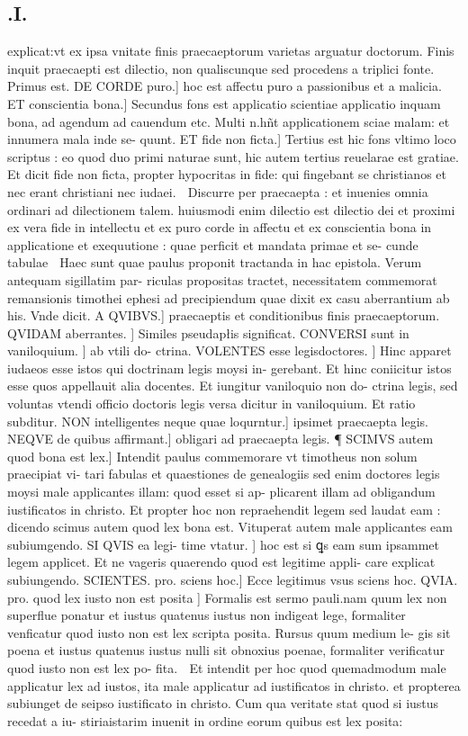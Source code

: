 \documentclass{article}
\begin{document}
\begin{pages}
\section*{.I. }\pstart explicat:vt ex ipsa vnitate finis praecaeptorum varietas arguatur doctorum. Finis inquit praecaepti est dilectio, non qualiscunque sed procedens a triplici fonte. Primus est. DE CORDE puro.] hoc est affectu puro a passionibus et a malicia. ET conscientia bona.] Secundus fons est applicatio scientiae applicatio inquam bona, ad agendum ad cauendum etc. Multi n.hñt applicationem sciae malam: et innumera mala inde se- quunt. ET fide non ficta.] Tertius est hic fons vltimo loco scriptus : eo quod duo primi naturae sunt, hic autem tertius reuelarae est gratiae. Et dicit fide non ficta, propter hypocritas in fide: qui fingebant se christianos  et nec erant christiani nec iudaei.  Discurre per praecaepta : et inuenies omnia ordinari ad dilectionem talem. huiusmodi enim dilectio est dilectio dei et proximi ex vera fide in intellectu et ex puro corde in affectu et ex conscientia bona in applicatione et exequutione : quae perficit et mandata primae et se- cunde tabulae  Haec sunt quae paulus proponit tractanda in hac epistola. Verum antequam sigillatim par- riculas propositas tractet, necessitatem commemorat remansionis timothei ephesi ad precipiendum quae dixit ex casu aberrantium ab his. Vnde dicit. A QVIBVS.] praecaeptis et conditionibus finis praecaeptorum. QVIDAM aberrantes. ] Similes pseudapłis significat. CONVERSI sunt in vaniloquium. ] ab vtili do- ctrina. VOLENTES esse legisdoctores. ] Hinc apparet iudaeos esse istos qui doctrinam legis moysi in- gerebant. Et hinc coniicitur istos esse quos appellauit alia docentes. Et iungitur vaniloquio non do- ctrina legis, sed voluntas vtendi officio doctoris legis versa dicitur in vaniloquium. Et ratio subditur. NON intelligentes neque quae loqurntur.] ipsimet praecaepta legis. NEQVE de quibus affirmant.] obligari ad praecaepta legis.  \pend\pstart ¶ SCIMVS autem quod bona est lex.] Intendit paulus commemorare vt timotheus non solum praecipiat vi- tari fabulas et quaestiones de genealogiis sed enim doctores legis moysi male applicantes illam: quod esset si ap- plicarent illam ad obligandum iustificatos in christo. Et propter hoc non repraehendit legem sed laudat eam : dicendo scimus autem quod lex bona est. Vituperat autem male applicantes eam subiumgendo. SI QVIS ea legi- time vtatur. ] hoc est si ꝗs eam sum ipsammet legem applicet. Et ne vageris quaerendo quod est legitime appli- care explicat subiungendo. SCIENTES. pro. sciens hoc.] Ecce legitimus vsus sciens hoc. QVIA. pro. quod lex iusto non est posita ] Formalis est sermo pauli.nam quum lex non superflue ponatur et iustus quatenus iustus non indigeat lege, formaliter venficatur quod iusto non est lex scripta posita. Rursus quum medium le- gis sit poena et iustus quatenus iustus nulli sit obnoxius poenae, formaliter verificatur quod iusto non est lex po- fita.  Et intendit per hoc quod quemadmodum male applicatur lex ad iustos, ita male applicatur ad iustificatos in christo. et propterea subiunget de seipso iustificato in christo. Cum qua veritate stat quod si iustus recedat a iu- stiriaistarim inuenit in ordine eorum quibus est lex posita: 
\end{pages}
\end{document}
